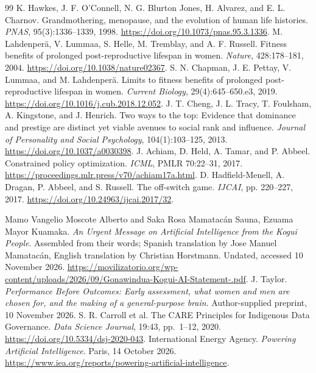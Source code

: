 \documentclass[10pt,twocolumn,letterpaper]{article}
\begin{document}
\begin{thebibliography}{99}
 K. Hawkes, J. F. O'Connell, N. G. Blurton Jones, H. Alvarez, and E. L. Charnov. Grandmothering, menopause, and the evolution of human life histories. \emph{PNAS}, 95(3):1336--1339, 1998. \url{https://doi.org/10.1073/pnas.95.3.1336}.
 M. Lahdenper\"a, V. Lummaa, S. Helle, M. Tremblay, and A. F. Russell. Fitness benefits of prolonged post-reproductive lifespan in women. \emph{Nature}, 428:178--181, 2004. \url{https://doi.org/10.1038/nature02367}.
 S. N. Chapman, J. E. Pettay, V. Lummaa, and M. Lahdenper\"a. Limits to fitness benefits of prolonged post-reproductive lifespan in women. \emph{Current Biology}, 29(4):645--650.e3, 2019. \url{https://doi.org/10.1016/j.cub.2018.12.052}.
 J. T. Cheng, J. L. Tracy, T. Foulsham, A. Kingstone, and J. Henrich. Two ways to the top: Evidence that dominance and prestige are distinct yet viable avenues to social rank and influence. \emph{Journal of Personality and Social Psychology}, 104(1):103--125, 2013. \url{https://doi.org/10.1037/a0030398}.
 J. Achiam, D. Held, A. Tamar, and P. Abbeel. Constrained policy optimization. \emph{ICML}, PMLR 70:22--31, 2017. \url{https://proceedings.mlr.press/v70/achiam17a.html}.
 D. Hadfield-Menell, A. Dragan, P. Abbeel, and S. Russell. The off-switch game. \emph{IJCAI}, pp. 220--227, 2017. \url{https://doi.org/10.24963/ijcai.2017/32}.

 Mamo Vangelio Moscote Alberto and Saka Rosa Mamatac\'an Sauna, Ezuama Mayor Kuamaka. \emph{An Urgent Message on Artificial Intelligence from the Kogui People}. Assembled from their words; Spanish translation by Jose Manuel Mamatac\'an, English translation by Christian Horstmann. Undated, accessed 10 November 2026. \url{https://movilizatorio.org/wp-content/uploads/2026/09/Gonawindua-Kogui-AI-Statement-.pdf}.
 J. Taylor. \emph{Performance Before Outcomes: Early assessment, what women and men are chosen for, and the making of a general-purpose brain}. Author-supplied preprint, 10 November 2026.
 S. R. Carroll et al. The CARE Principles for Indigenous Data Governance. \emph{Data Science Journal}, 19:43, pp.~1--12, 2020. \url{https://doi.org/10.5334/dsj-2020-043}.
 International Energy Agency. \emph{Powering Artificial Intelligence}. Paris, 14 October 2026. \url{https://www.iea.org/reports/powering-artificial-intelligence}.
\end{thebibliography}
\endgroup
\end{document}
